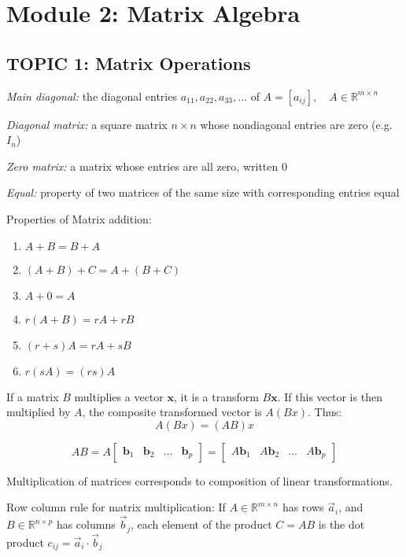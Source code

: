 \documentclass[12pt]{article} %
\newcommand{\R}{\mathbb{R}}
\begin{document}
\pagebreak
\section{Module 2: Matrix Algebra}
\subsection{TOPIC 1: Matrix Operations}
\emph{Main diagonal:} the diagonal entries $a_{11}, a_{22}, a_{33}, ...$ of $A=[a_{ij}], \quad A\in \R^{m\times n}$

\emph{Diagonal matrix:} a square matrix $n \times n$ whose nondiagonal entries are zero (e.g. $I_n$)

\emph{Zero matrix:} a matrix whose entries are all zero, written $0$

\emph{Equal:} property of two matrices of the same size with corresponding entries equal

Properties of Matrix addition:
\begin{enumerate}
	\item $A + B = B + A$
	\item $(A + B) + C = A + (B + C)$
	\item $A + 0 = A$
	\item $r(A + B) = rA + rB$
	\item $(r + s)A = rA + sB$
	\item $r(sA) = (rs)A$
\end{enumerate}

If a matrix $B$ multiplies a vector $\mathbf{x}$, it is a transform $B\mathbf{x}$. If this vector is then multiplied by $A$, the composite transformed vector is $A(Bx)$. Thus:
$$A(Bx) = (AB)x$$

$$AB = A\begin{bmatrix}
	\mathbf{b}_1 & \mathbf{b}_2 & ... & \mathbf{b}_p
\end{bmatrix} = \begin{bmatrix}
	A\mathbf{b}_1 & A\mathbf{b}_2 & ... &A\mathbf{b}_p
\end{bmatrix}$$

Multiplication of matrices corresponds to composition of linear transformations.

Row column rule for matrix multiplication:
If $A \in \R^{m \times n}$ has rows $\vec{a}_i$, and $B \in \R^{n\times p}$ has columns $\vec{b}_j$, each element of the product $C = AB$ is the dot product $c_{ij} = \vec{a}_i \cdot \vec{b}_j$
\end{document}
